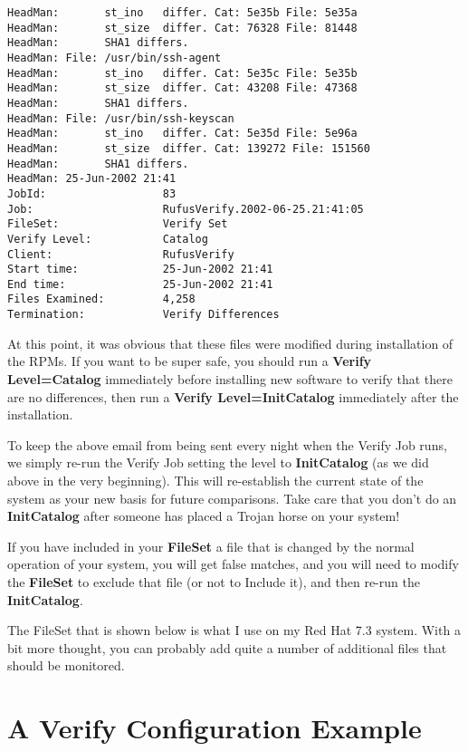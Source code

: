 \begin{verbatim}
HeadMan:       st_ino   differ. Cat: 5e35b File: 5e35a
HeadMan:       st_size  differ. Cat: 76328 File: 81448
HeadMan:       SHA1 differs.
HeadMan: File: /usr/bin/ssh-agent
HeadMan:       st_ino   differ. Cat: 5e35c File: 5e35b
HeadMan:       st_size  differ. Cat: 43208 File: 47368
HeadMan:       SHA1 differs.
HeadMan: File: /usr/bin/ssh-keyscan
HeadMan:       st_ino   differ. Cat: 5e35d File: 5e96a
HeadMan:       st_size  differ. Cat: 139272 File: 151560
HeadMan:       SHA1 differs.
HeadMan: 25-Jun-2002 21:41
JobId:                  83
Job:                    RufusVerify.2002-06-25.21:41:05
FileSet:                Verify Set
Verify Level:           Catalog
Client:                 RufusVerify
Start time:             25-Jun-2002 21:41
End time:               25-Jun-2002 21:41
Files Examined:         4,258
Termination:            Verify Differences
\end{verbatim}
\normalsize

At this point, it was obvious that these files were modified during
installation of the RPMs. If you want to be super safe, you should run a {\bf
Verify Level=Catalog} immediately before installing new software to verify
that there are no differences, then run a {\bf Verify Level=InitCatalog}
immediately after the installation.

To keep the above email from being sent every night when the Verify Job runs,
we simply re-run the Verify Job setting the level to {\bf InitCatalog} (as we
did above in the very beginning). This will re-establish the current state of
the system as your new basis for future comparisons. Take care that you don't
do an {\bf InitCatalog} after someone has placed a Trojan horse on your
system!

If you have included in your {\bf FileSet} a file that is changed by the
normal operation of your system, you will get false matches, and you will need
to modify the {\bf FileSet} to exclude that file (or not to Include it), and
then re-run the {\bf InitCatalog}.

The FileSet that is shown below is what I use on my Red Hat 7.3 system. With a
bit more thought, you can probably add quite a number of additional files that
should be monitored.

\section{A Verify Configuration Example}

